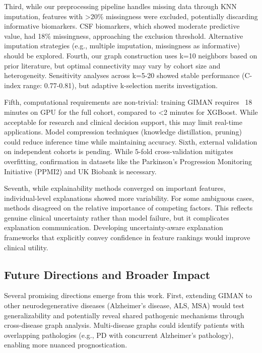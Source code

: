 Third, while our preprocessing pipeline handles missing data through KNN imputation, features with >20\% missingness were excluded, potentially discarding informative biomarkers. CSF biomarkers, which showed moderate predictive value, had 18\% missingness, approaching the exclusion threshold. Alternative imputation strategies (e.g., multiple imputation, missingness as informative) should be explored. Fourth, our graph construction uses k=10 neighbors based on prior literature, but optimal connectivity may vary by cohort size and heterogeneity. Sensitivity analyses across k=5-20 showed stable performance (C-index range: 0.77-0.81), but adaptive k-selection merits investigation.

Fifth, computational requirements are non-trivial: training GIMAN requires ~18 minutes on GPU for the full cohort, compared to <2 minutes for XGBoost. While acceptable for research and clinical decision support, this may limit real-time applications. Model compression techniques (knowledge distillation, pruning) could reduce inference time while maintaining accuracy. Sixth, external validation on independent cohorts is pending. While 5-fold cross-validation mitigates overfitting, confirmation in datasets like the Parkinson's Progression Monitoring Initiative (PPMI2) and UK Biobank is necessary.

Seventh, while explainability methods converged on important features, individual-level explanations showed more variability. For some ambiguous cases, methods disagreed on the relative importance of competing factors. This reflects genuine clinical uncertainty rather than model failure, but it complicates explanation communication. Developing uncertainty-aware explanation frameworks that explicitly convey confidence in feature rankings would improve clinical utility.

\subsection{Future Directions and Broader Impact}

Several promising directions emerge from this work. First, extending GIMAN to other neurodegenerative diseases (Alzheimer's disease, ALS, MSA) would test generalizability and potentially reveal shared pathogenic mechanisms through cross-disease graph analysis. Multi-disease graphs could identify patients with overlapping pathologies (e.g., PD with concurrent Alzheimer's pathology), enabling more nuanced prognostication.

